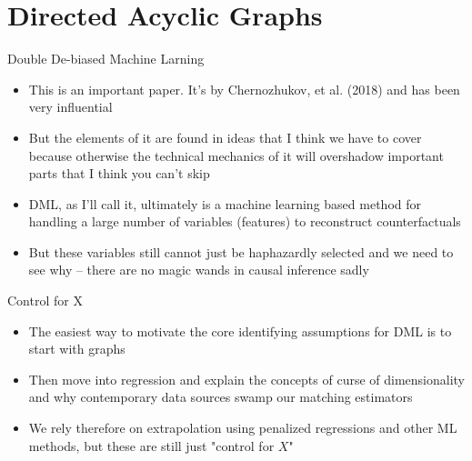 \documentclass{beamer}
\begin{document}




\section{Directed Acyclic Graphs}

\begin{frame}{Double De-biased Machine Larning}

\begin{itemize}

\item This is an important paper.  It's by Chernozhukov, et al. (2018) and has been very influential
\item But the elements of it are found in ideas that I think we have to cover because otherwise the technical mechanics of it will overshadow important parts that I think you can't skip
\item DML, as I'll call it, ultimately is a machine learning based method for handling a large number of variables (features) to reconstruct counterfactuals
\item But these variables still cannot just be haphazardly selected and we need to see why -- there are no magic wands in causal inference sadly

\end{itemize}

\end{frame}

\begin{frame}{Control for X}

\begin{itemize}

\item The easiest way to motivate the core identifying assumptions for DML is to start with graphs
\item Then move into regression and explain the concepts of curse of dimensionality and why contemporary data sources swamp our matching estimators
\item We rely therefore on extrapolation using penalized regressions and other ML methods, but these are still just "control for $X$"

\end{itemize}

\end{frame}
\end{document}
